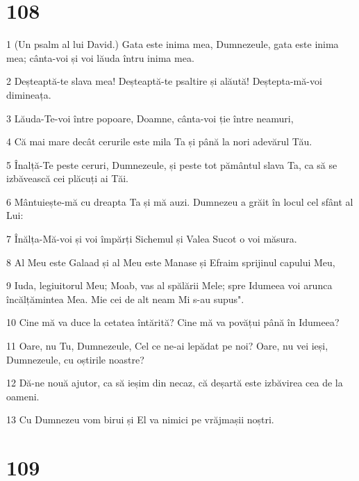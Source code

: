 \chapter{108}

\par 1 (Un psalm al lui David.) Gata este inima mea, Dumnezeule, gata este inima mea; cânta-voi și voi lăuda întru inima mea.
\par 2 Deșteaptă-te slava mea! Deșteaptă-te psaltire și alăută! Deștepta-mă-voi dimineața.
\par 3 Lăuda-Te-voi între popoare, Doamne, cânta-voi ție între neamuri,
\par 4 Că mai mare decât cerurile este mila Ta și până la nori adevărul Tău.
\par 5 Înalță-Te peste ceruri, Dumnezeule, și peste tot pământul slava Ta, ca să se izbăvească cei plăcuți ai Tăi.
\par 6 Mântuiește-mă cu dreapta Ta și mă auzi. Dumnezeu a grăit în locul cel sfânt al Lui:
\par 7 Înălța-Mă-voi și voi împărți Sichemul și Valea Sucot o voi măsura.
\par 8 Al Meu este Galaad și al Meu este Manase și Efraim sprijinul capului Meu,
\par 9 Iuda, legiuitorul Meu; Moab, vas al spălării Mele; spre Idumeea voi arunca încălțămintea Mea. Mie cei de alt neam Mi s-au supus".
\par 10 Cine mă va duce la cetatea întărită? Cine mă va povățui până în Idumeea?
\par 11 Oare, nu Tu, Dumnezeule, Cel ce ne-ai lepădat pe noi? Oare, nu vei ieși, Dumnezeule, cu oștirile noastre?
\par 12 Dă-ne nouă ajutor, ca să ieșim din necaz, că deșartă este izbăvirea cea de la oameni.
\par 13 Cu Dumnezeu vom birui și El va nimici pe vrăjmașii noștri.

\chapter{109}

